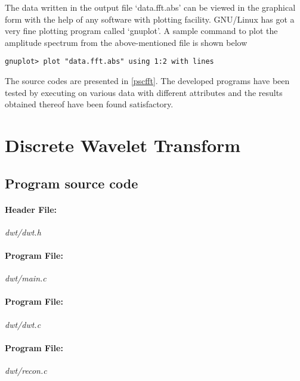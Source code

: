 \documentclass[a4paper,11pt]{report}
\begin{document}
The data written in the output file `data.fft.abs' can be viewed in the graphical form with the help of any software with plotting facility. GNU/Linux has got a very fine plotting program called `gnuplot'. A sample command to plot the amplitude spectrum from the above-mentioned file is shown below 

\begin{verbatim}
gnuplot> plot "data.fft.abs" using 1:2 with lines
\end{verbatim}

The source codes are presented in \ref{pscfft}. The developed programs have been tested by executing on various data with different attributes and the results obtained thereof have been found satisfactory.


\section{Discrete Wavelet Transform}
\subsection{Program source code} \label{pscdwt}
\paragraph{Header File:} \textit{dwt/dwt.h}
\vspace{5pt}
{\scriptsize
\begin{lgrind}

\end{lgrind}
}

\paragraph{Program File:} \textit{dwt/main.c}
\vspace{5pt}
{\scriptsize
\begin{lgrind}

\end{lgrind}
}

\paragraph{Program File:} \textit{dwt/dwt.c}
\vspace{5pt}
{\scriptsize
\begin{lgrind}

\end{lgrind}
}

\paragraph{Program File:} \textit{dwt/recon.c}
\vspace{5pt}
{\scriptsize
\begin{lgrind}

\end{lgrind}
}
\end{document}
